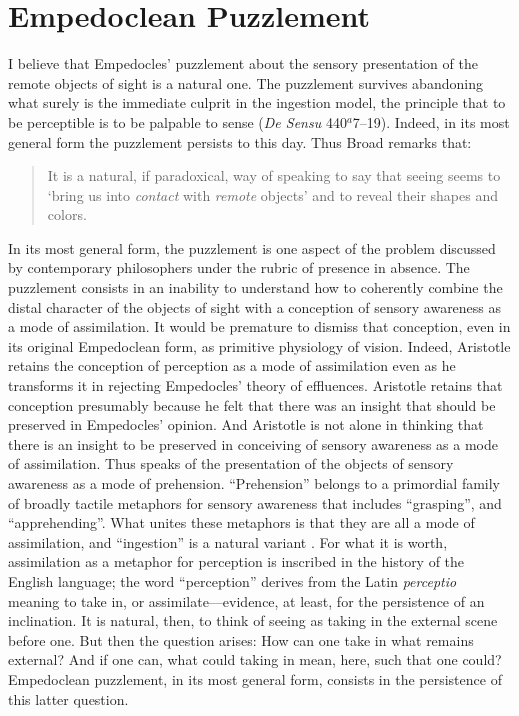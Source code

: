 
\section{Empedoclean Puzzlement} %
\label{sec:empedoclean_puzzlement}

I believe that Empedocles' puzzlement about the sensory presentation of the remote objects of sight is a natural one. The puzzlement survives abandoning what surely is the immediate culprit in the ingestion model, the principle that to be perceptible is to be palpable to sense (\emph{De Sensu} 440\( ^{a} \)7--19). Indeed, in its most general form the puzzlement persists to this day. Thus Broad remarks that:
\begin{quote}
    It is a natural, if paradoxical, way of speaking to say that seeing seems to `bring us into \emph{contact} with \emph{remote} objects' and to reveal their shapes and colors. \citep[33]{Broad:1952kx}
\end{quote}
In its most general form, the puzzlement is one aspect of the problem discussed by contemporary philosophers under the rubric of presence in absence. The puzzlement consists in an inability to understand how to coherently combine the distal character of the objects of sight with a conception of sensory awareness as a mode of assimilation. It would be premature to dismiss that conception, even in its original Empedoclean form, as primitive physiology of vision. Indeed, Aristotle retains the conception of perception as a mode of assimilation even as he transforms it in rejecting Empedocles' theory of effluences. Aristotle retains that conception presumably because he felt that there was an insight that should be preserved in Empedocles' opinion. And Aristotle is not alone in thinking that there is an insight to be preserved in conceiving of sensory awareness as a mode of assimilation. Thus \citet{Broad:1952kx} speaks of the presentation of the objects of sensory awareness as a mode of prehension.  ``Prehension'' belongs to a primordial family of broadly tactile metaphors for sensory awareness that includes ``grasping'', and ``apprehending''. What unites these metaphors is that they are all a mode of assimilation, and ``ingestion'' is a natural variant \citep[see][7]{Johnston:2006uq,Price:1932fk}. For what it is worth, assimilation as a metaphor for perception is inscribed in the history of the English language; the word ``perception'' derives from the Latin \emph{perceptio} meaning to take in, or assimilate---evidence, at least, for the persistence of an inclination. It is natural, then, to think of seeing as taking in the external scene before one. But then the question arises: How can one take in what remains external? And if one can, what could taking in mean, here, such that one could? Empedoclean puzzlement, in its most general form, consists in the persistence of this latter question.


